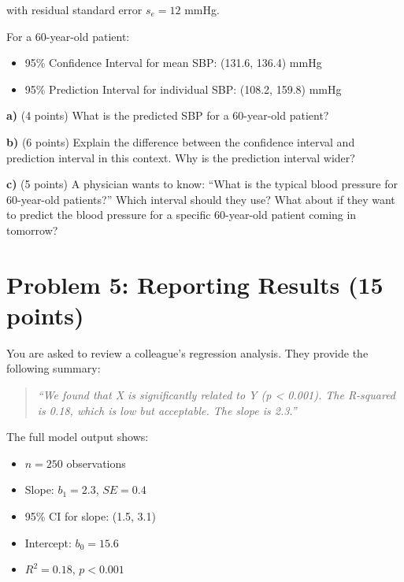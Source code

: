 \documentclass[11pt]{article}
\begin{document}
with residual standard error $s_e = 12$ mmHg.

For a 60-year-old patient:
\begin{itemize}
\item 95\% Confidence Interval for mean SBP: (131.6, 136.4) mmHg
\item 95\% Prediction Interval for individual SBP: (108.2, 159.8) mmHg
\end{itemize}

\vspace{0.5cm}

\textbf{a)} (4 points) What is the predicted SBP for a 60-year-old patient?

\vspace{2cm}

\textbf{b)} (6 points) Explain the difference between the confidence interval and prediction interval in this context. Why is the prediction interval wider?

\vspace{3.5cm}

\textbf{c)} (5 points) A physician wants to know: ``What is the typical blood pressure for 60-year-old patients?'' Which interval should they use? What about if they want to predict the blood pressure for a specific 60-year-old patient coming in tomorrow?

\vspace{3.5cm}

\newpage

\section*{Problem 5: Reporting Results (15 points)}

You are asked to review a colleague's regression analysis. They provide the following summary:

\begin{quote}
\textit{``We found that X is significantly related to Y (p < 0.001). The R-squared is 0.18, which is low but acceptable. The slope is 2.3.''}
\end{quote}

The full model output shows:
\begin{itemize}
\item $n = 250$ observations
\item Slope: $b_1 = 2.3$, $SE = 0.4$
\item 95\% CI for slope: (1.5, 3.1)
\item Intercept: $b_0 = 15.6$
\item $R^2 = 0.18$, $p < 0.001$
\end{itemize}
\end{document}
